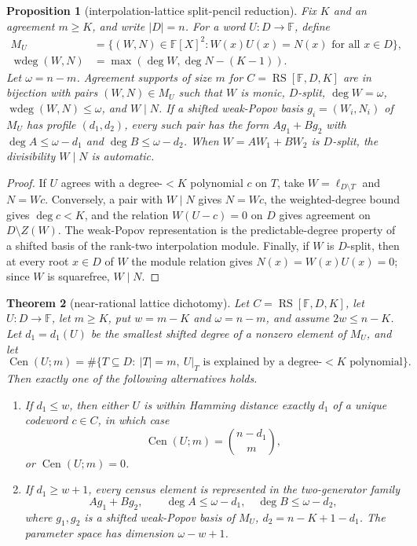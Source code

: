\documentclass[a4paper,11pt]{amsart}
\newtheorem{theorem}{Theorem}[section]
\newtheorem{proposition}[theorem]{Proposition}
\theoremstyle{remark}
\newcommand{\F}{\mathbb F}
\newcommand{\RS}{\operatorname{RS}}
\newcommand{\wdeg}{\operatorname{wdeg}}
\newcommand{\Cen}{\operatorname{Cen}}
\begin{document}
\begin{proposition}[interpolation-lattice split-pencil reduction]\label{prop:lattice-split}
Fix \(K\) and an agreement \(m\ge K\), and write \(|D|=n\).  For a word \(U:D\to\F\), define
\begin{align*}
        M_U&=\{(W,N)\in\F[X]^2:
        W(x)U(x)=N(x)\text{ for all }x\in D\},\\
        \wdeg(W,N)&=\max(\deg W,\deg N-(K-1)).
\end{align*}
Let \(\omega=n-m\).  Agreement supports of size \(m\) for \(C=\RS[\F,D,K]\) are in bijection with pairs \((W,N)\in M_U\) such that \(W\) is monic, \(D\)-split, \(\deg W=\omega\), \(\wdeg(W,N)\le\omega\), and \(W\mid N\).  If a shifted weak-Popov basis \(g_i=(W_i,N_i)\) of \(M_U\) has profile \((d_1,d_2)\), every such pair has the form \(Ag_1+Bg_2\) with \(\deg A\le\omega-d_1\) and \(\deg B\le\omega-d_2\).  When \(W=AW_1+BW_2\) is \(D\)-split, the divisibility \(W\mid N\) is automatic.
\end{proposition}

\begin{proof}
If \(U\) agrees with a degree-\(<K\) polynomial \(c\) on \(T\), take \(W=\ell_{D\setminus T}\) and \(N=Wc\).  Conversely, a pair with \(W\mid N\) gives \(N=Wc\), the weighted-degree bound gives \(\deg c<K\), and the relation \(W(U-c)=0\) on \(D\) gives agreement on \(D\setminus Z(W)\).  The weak-Popov representation is the predictable-degree property of a shifted basis of the rank-two interpolation module.  Finally, if \(W\) is \(D\)-split, then at every root \(x\in D\) of \(W\) the module relation gives \(N(x)=W(x)U(x)=0\); since \(W\) is squarefree, \(W\mid N\).
\end{proof}

\begin{theorem}[near-rational lattice dichotomy]\label{thm:near-rational}
Let \(C=\RS[\F,D,K]\), let \(U:D\to\F\), let \(m\ge K\), put \(w=m-K\) and \(\omega=n-m\), and assume \(2w\le n-K\).  Let \(d_1=d_1(U)\) be the smallest shifted degree of a nonzero element of \(M_U\), and let
\[
        \Cen(U;m)=\#\{T\subseteq D:\ |T|=m,\ U|_T\text{ is explained by a degree-}<K\text{ polynomial}\}.
\]
Then exactly one of the following alternatives holds.
\begin{enumerate}[label=\textup{(\roman*)}]
\item If \(d_1\le w\), then either \(U\) is within Hamming distance exactly \(d_1\) of a unique codeword \(c\in C\), in which case
\[
        \Cen(U;m)=\binom{n-d_1}{m},
\]
or \(\Cen(U;m)=0\).
\item If \(d_1\ge w+1\), every census element is represented in the two-generator family
\[
        Ag_1+Bg_2,\qquad
        \deg A\le\omega-d_1,\quad \deg B\le\omega-d_2,
\]
where \(g_1,g_2\) is a shifted weak-Popov basis of \(M_U\), \(d_2=n-K+1-d_1\).  The parameter space has dimension \(\omega-w+1\).
\end{enumerate}
\end{theorem}
\end{document}
